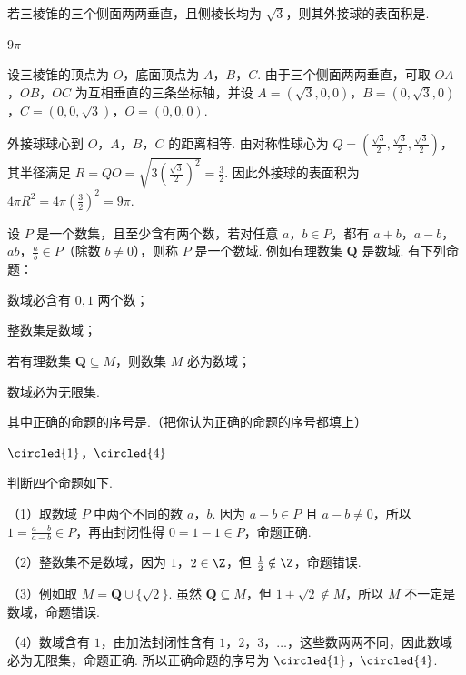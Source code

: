 \begin{problem}
若三棱锥的三个侧面两两垂直，且侧棱长均为 \(\sqrt{3}\)，则其外接球的表面积是\fillinblank{}.

\begin{answer}
\(9\pi\)
\end{answer}

\begin{solution}
设三棱锥的顶点为 \(O\)，底面顶点为 \(A\)，\(B\)，\(C\). 由于三个侧面两两垂直，可取 \(OA\)，\(OB\)，\(OC\) 为互相垂直的三条坐标轴，并设 \(A=(\sqrt3,0,0)\)，\(B=(0,\sqrt3,0)\)，\(C=(0,0,\sqrt3)\)，\(O=(0,0,0)\).

外接球球心到 \(O\)，\(A\)，\(B\)，\(C\) 的距离相等. 由对称性球心为 \(Q=\left(\frac{\sqrt3}{2},\frac{\sqrt3}{2},\frac{\sqrt3}{2}\right)\)，其半径满足 \(R=QO=\sqrt{3\left(\frac{\sqrt3}{2}\right)^2}=\frac32\). 因此外接球的表面积为 \(4\pi R^2=4\pi\left(\frac32\right)^2=9\pi\).
\end{solution}
\end{problem}

\begin{problem}
设 \(P\) 是一个数集，且至少含有两个数，若对任意 \(a\)，\(b \in P\)，都有 \(a+b\)，\(a-b\)，\(ab\)，\(\frac{a}{b} \in P\)（除数 \(b \neq 0\)），则称 \(P\) 是一个数域. 例如有理数集 \(\mathbf{Q}\) 是数域. 有下列命题：

\begin{circlelist}
\item 数域必含有 \(0,1\) 两个数；
\item 整数集是数域；
\item 若有理数集 \(\mathbf{Q} \subseteq M\)，则数集 \(M\) 必为数域；
\item 数域必为无限集.
\end{circlelist}

其中正确的命题的序号是\fillinblank{}.（把你认为正确的命题的序号都填上）

\begin{answer}
\(\circled{1}\)，\(\circled{4}\)
\end{answer}

\begin{solution}
判断四个命题如下.

（1）取数域 \(P\) 中两个不同的数 \(a\)，\(b\). 因为 \(a-b\in P\) 且 \(a-b\neq0\)，所以 \(1=\frac{a-b}{a-b}\in P\)，再由封闭性得 \(0=1-1\in P\)，命题正确.

（2）整数集不是数域，因为 \(1\)，\(2\in\Z\)，但 \(\frac12\notin\Z\)，命题错误.

（3）例如取 \(M=\mathbf{Q}\cup\{\sqrt2\}\). 虽然 \(\mathbf{Q}\subseteq M\)，但 \(1+\sqrt2\notin M\)，所以 \(M\) 不一定是数域，命题错误.

（4）数域含有 \(1\)，由加法封闭性含有 \(1\)，\(2\)，\(3\)，\(\ldots\)，这些数两两不同，因此数域必为无限集，命题正确. 所以正确命题的序号为 \(\circled{1}\)，\(\circled{4}\).
\end{solution}
\end{problem}

